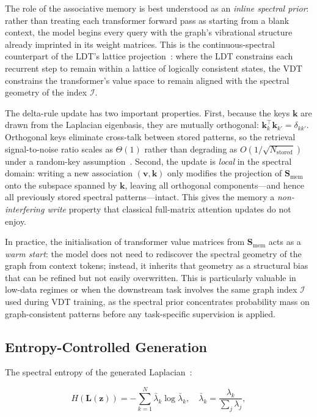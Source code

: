 \documentclass[11pt,a4paper]{article}
\newcommand{\Lmat}{\mathbf{L}}
\newcommand{\Smat}{\mathbf{S}}
\newcommand{\T}{^{\intercal}}
\begin{document}
The role of the associative memory is best understood as an
\emph{inline spectral prior}: rather than treating each transformer
forward pass as starting from a blank context, the model begins every
query with the graph's vibrational structure already imprinted in its
weight matrices.  This is the continuous-spectral counterpart of the
LDT's lattice projection~\cite{davis2026ldt}: where the LDT constrains
each recurrent step to remain within a lattice of logically consistent
states, the VDT constrains the transformer's value space to remain
aligned with the spectral geometry of the index $\mathcal{I}$.

The delta-rule update has two important properties.  First, because the
keys $\mathbf{k}$ are drawn from the Laplacian eigenbasis, they are mutually
orthogonal: $\mathbf{k}_k\T\mathbf{k}_{k'} = \delta_{kk'}$.  Orthogonal keys
eliminate cross-talk between stored patterns, so the retrieval signal-to-noise
ratio scales as $\Theta(1)$ rather than degrading as $O(1/\sqrt{N_{\text{stored}}})$
under a random-key assumption~\cite{hopfield1982}.
Second, the update is \emph{local} in the spectral domain: writing a new
association $(\mathbf{v}, \mathbf{k})$ only modifies the projection of
$\Smat_{\mathrm{mem}}$ onto the subspace spanned by $\mathbf{k}$, leaving all
orthogonal components---and hence all previously stored spectral patterns---intact.
This gives the memory a \emph{non-interfering write} property that classical
full-matrix attention updates do not enjoy.

In practice, the initialisation of transformer value matrices from
$\Smat_{\mathrm{mem}}$ acts as a \emph{warm start}: the model does not need
to rediscover the spectral geometry of the graph from context tokens;
instead, it inherits that geometry as a structural bias that can be refined
but not easily overwritten.  This is particularly valuable in low-data regimes
or when the downstream task involves the same graph index $\mathcal{I}$ used
during VDT training, as the spectral prior concentrates probability mass on
graph-consistent patterns before any task-specific supervision is applied.

\subsection{Entropy-Controlled Generation}
\label{sec:memory:generation}

The spectral entropy of the generated Laplacian~\cite{jaynes1957}:

\begin{equation}
  H(\Lmat(\mathbf{z})) = -\sum_{k=1}^{N}\bar{\lambda}_k\log\bar{\lambda}_k,
  \quad \bar{\lambda}_k = \frac{\lambda_k}{\sum_j\lambda_j},
  \label{eq:entropy}
\end{equation}
\end{document}
